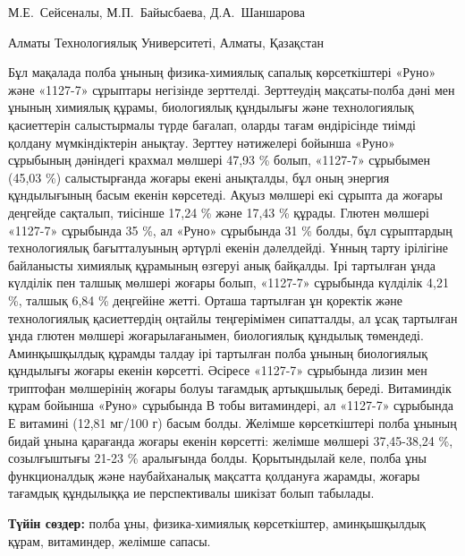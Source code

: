
\begin{header}

М.Е.~Сейсеналы\envelope,
М.П.~Байысбаева,
Д.А.~Шаншарова
\end{header}

\begin{affil}
Алматы Технологиялық Университеті, Алматы, Қазақстан

\end{affil}

Бұл мақалада полба ұнының физика-химиялық сапалық көрсеткіштері «Руно»
және «1127-7» сұрыптары негізінде зерттелді. Зерттеудің мақсаты-полба
дәні мен ұнының химиялық құрамы, биологиялық құндылығы және
технологиялық қасиеттерін салыстырмалы түрде бағалап, оларды тағам
өндірісінде тиімді қолдану мүмкіндіктерін анықтау. Зерттеу нәтижелері
бойынша «Руно» сұрыбының дәніндегі крахмал мөлшері 47,93 \% болып,
«1127-7» сұрыбымен (45,03 \%) салыстырғанда жоғары екені анықталды, бұл
оның энергия құндылығының басым екенін көрсетеді. Ақуыз мөлшері екі
сұрыпта да жоғары деңгейде сақталып, тиісінше 17,24 \% және 17,43 \%
құрады. Глютен мөлшері «1127-7» сұрыбында 35 \%, ал «Руно» сұрыбында 31
\% болды, бұл сұрыптардың технологиялық бағытталуының әртүрлі екенін
дәлелдейді. Ұнның тарту ірілігіне байланысты химиялық құрамының өзгеруі
анық байқалды. Ірі тартылған ұнда күлділік пен талшық мөлшері жоғары
болып, «1127-7» сұрыбында күлділік 4,21 \%, талшық 6,84 \% деңгейіне
жетті. Орташа тартылған ұн қоректік және технологиялық қасиеттердің
оңтайлы теңгерімімен сипатталды, ал ұсақ тартылған ұнда глютен мөлшері
жоғарылағанымен, биологиялық құндылық төмендеді. Аминқышқылдық құрамды
талдау ірі тартылған полба ұнының биологиялық құндылығы жоғары екенін
көрсетті. Әсіресе «1127-7» сұрыбында лизин мен триптофан мөлшерінің
жоғары болуы тағамдық артықшылық береді. Витаминдік құрам бойынша «Руно»
сұрыбында В тобы витаминдері, ал «1127-7» сұрыбында Е витамині (12,81
мг/100 г) басым болды. Желімше көрсеткіштері полба ұнының бидай ұнына
қарағанда жоғары екенін көрсетті: желімше мөлшері 37,45-38,24 \%,
созылғыштығы 21-23 \% аралығында болды. Қорытындылай келе, полба ұны
функционалдық және наубайханалық мақсатта қолдануға жарамды, жоғары
тағамдық құндылыққа ие перспективалы шикізат болып табылады.

{\bfseries Түйін сөздер:} полба ұны, физика-химиялық көрсеткіштер,
аминқышқылдық құрам, витаминдер, желімше сапасы.

